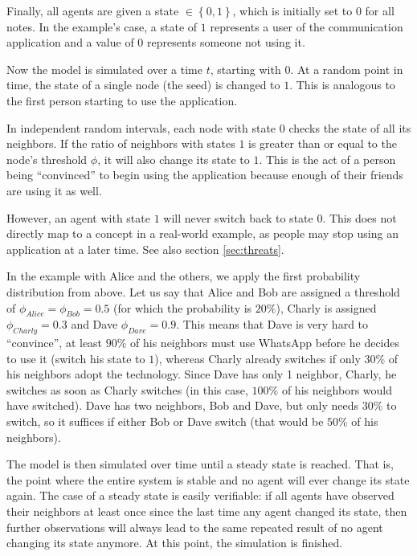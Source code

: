 \documentclass{sig-alternate-05-2015}
\begin{document}
Finally, all agents are given a state $\in \left\lbrace 0, 1 \right\rbrace$, which is initially set to $0$ for all notes. In the example's case, a state of $1$ represents a user of the communication application and a value of $0$ represents someone not using it.

Now the model is simulated over a time $t$, starting with $0$. At a random point in time, the state of a single node (the seed) is changed to $1$. This is analogous to the first person starting to use the application.

In independent random intervals, each node with state $0$ checks the state of all its neighbors. If the ratio of neighbors with states $1$ is greater than or equal to the node's threshold $\phi$, it will also change its state to $1$. This is the act of a person being ``convinced'' to begin using the application because enough of their friends are using it as well.

However, an agent with state $1$ will never switch back to state $0$. This does not directly map to a concept in a real-world example, as people may stop using an application at a later time. See also section \ref{sec:threats}.

In the example with Alice and the others, we apply the first probability distribution from above. Let us say that Alice and Bob are assigned a threshold of $\phi_{Alice} = \phi_{Bob} = 0.5$ (for which the probability is $20\%$), Charly is assigned $\phi_{Charly} = 0.3$ and Dave $\phi_{Dave} = 0.9$. This means that Dave is very hard to ``convince'', at least $90\%$ of his neighbors must use WhatsApp before he decides to use it (switch his state to $1$), whereas Charly already switches if only $30\%$ of his neighbors adopt the technology. Since Dave has only 1 neighbor, Charly, he switches as soon as Charly switches (in this case, $100\%$ of his neighbors would have switched). Dave has two neighbors, Bob and Dave, but only needs $30\%$ to switch, so it suffices if either Bob or Dave switch (that would be $50\%$ of his neighbors).

The model is then simulated over time until a steady state is reached. That is, the point where the entire system is stable and no agent will ever change its state again. The case of a steady state is easily verifiable: if all agents have observed their neighbors at least once since the last time any agent changed its state, then further observations will always lead to the same repeated result of no agent changing its state anymore. At this point, the simulation is finished.
\end{document}
